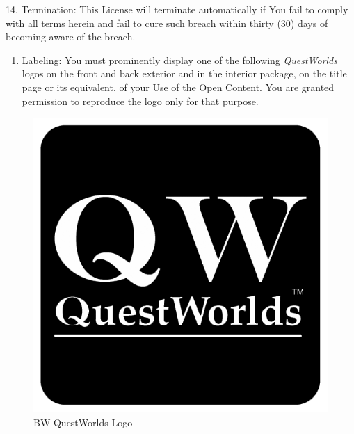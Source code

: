 \documentclass[
]{article}
\providecommand{\tightlist}{%
  \setlength{\itemsep}{0pt}\setlength{\parskip}{0pt}}
\begin{document}
14. Termination: This License will terminate automatically if You fail
to comply with all terms herein and fail to cure such breach within
thirty (30) days of becoming aware of the breach.

\begin{enumerate}
\def\labelenumi{\arabic{enumi}.}
\setcounter{enumi}{14}
\tightlist
\item
  Labeling: You must prominently display one of the following
  \emph{QuestWorlds} logos on the front and back exterior and in the
  interior package, on the title page or its equivalent, of your Use of
  the Open Content. You are granted permission to reproduce the logo
  only for that purpose.
\end{enumerate}

\begin{figure}
\centering
\includegraphics{Logos/QuestWorlds-Logo-TM-black.png}
\caption{BW QuestWorlds Logo}
\end{figure}
\end{document}
